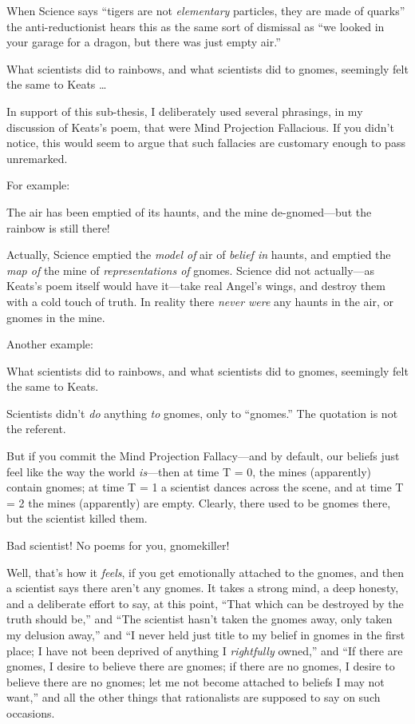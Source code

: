 {
 When Science says ``tigers are not
\textit{elementary} particles, they are made of
quarks'' the anti-reductionist hears this as the same
sort of dismissal as ``we looked in your garage for a
dragon, but there was just empty air.''}

{
 What scientists did to rainbows, and what scientists did to
gnomes, seemingly felt the same to Keats \ldots}

{
 In support of this sub-thesis, I deliberately used several
phrasings, in my discussion of Keats's poem, that were
Mind Projection Fallacious. If you didn't notice, this
would seem to argue that such fallacies are customary enough to pass
unremarked.}

{
 For example:}

{
 The air has been emptied of its haunts, and the mine
de-gnomed---but the rainbow is still there!}

{
 Actually, Science emptied the \textit{model of} air of
\textit{belief in} haunts, and emptied the \textit{map of} the mine of
\textit{representations of} gnomes. Science did not actually---as
Keats's poem itself would have it---take real
Angel's wings, and destroy them with a cold touch of
truth. In reality there \textit{never were} any haunts in the air, or
gnomes in the mine.}

{
 Another example:}

{
 What scientists did to rainbows, and what scientists did to
gnomes, seemingly felt the same to Keats.}

{
 Scientists didn't \textit{do} anything \textit{to}
gnomes, only to ``gnomes.'' The
quotation is not the referent.}

{
 But if you commit the Mind Projection Fallacy---and by default,
our beliefs just feel like the way the world \textit{is}{}---then at
time T = 0, the mines (apparently) contain gnomes; at time T = 1 a
scientist dances across the scene, and at time T = 2 the mines
(apparently) are empty. Clearly, there used to be gnomes there, but the
scientist killed them.}

{
 Bad scientist! No poems for you, gnomekiller!}

{
 Well, that's how it \textit{feels}, if you get
emotionally attached to the gnomes, and then a scientist says there
aren't any gnomes. It takes a strong mind, a deep
honesty, and a deliberate effort to say, at this point,
``That which can be destroyed by the truth should
be,'' and ``The scientist
hasn't taken the gnomes away, only taken my delusion
away,'' and ``I never held just
title to my belief in gnomes in the first place; I have not been
deprived of anything I \textit{rightfully} owned,''
and ``If there are gnomes, I desire to believe there
are gnomes; if there are no gnomes, I desire to believe there are no
gnomes; let me not become attached to beliefs I may not
want,'' and all the other things that rationalists
are supposed to say on such occasions.}

